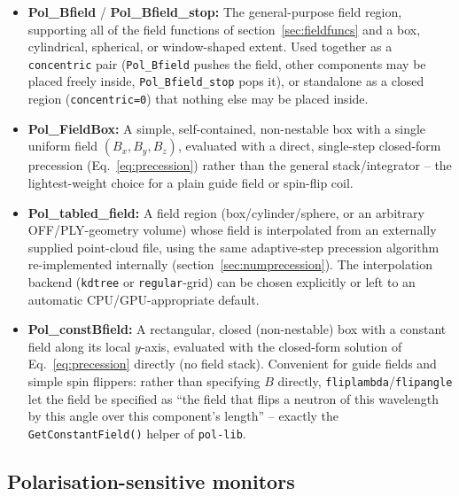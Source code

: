 \begin{itemize}
\item \textbf{Pol\_Bfield} / \textbf{Pol\_Bfield\_stop:} The general-purpose
  field region, supporting all of the field functions of
  section~\ref{sec:fieldfuncs} and a box, cylindrical, spherical, or
  window-shaped extent. Used together as a \texttt{concentric} pair
  (\texttt{Pol\_Bfield} pushes the field, other components may be placed
  freely inside, \texttt{Pol\_Bfield\_stop} pops it), or standalone as a
  closed region (\texttt{concentric=0}) that nothing else may be placed
  inside.
\item \textbf{Pol\_FieldBox:} A simple, self-contained, non-nestable box
  with a single uniform field $(B_x,B_y,B_z)$, evaluated with a direct,
  single-step closed-form precession (Eq.~\ref{eq:precession}) rather than
  the general stack/integrator -- the lightest-weight choice for a plain
  guide field or spin-flip coil.
\item \textbf{Pol\_tabled\_field:} A field region (box/cylinder/sphere, or
  an arbitrary OFF/PLY-geometry volume) whose field is interpolated from an
  externally supplied point-cloud file, using the same adaptive-step
  precession algorithm re-implemented internally
  (section~\ref{sec:numprecession}). The interpolation backend
  (\texttt{kdtree} or \texttt{regular}-grid) can be chosen explicitly or
  left to an automatic CPU/GPU-appropriate default.
\item \textbf{Pol\_constBfield:} A rectangular, closed (non-nestable) box
  with a constant field along its local $y$-axis, evaluated with the
  closed-form solution of Eq.~\ref{eq:precession} directly (no field
  stack). Convenient for guide fields and simple spin flippers: rather
  than specifying $B$ directly, \texttt{fliplambda}/\texttt{flipangle} let
  the field be specified as ``the field that flips a neutron of this
  wavelength by this angle over this component's length'' -- exactly the
  \texttt{GetConstantField()} helper of \texttt{pol-lib}.
\end{itemize}

\subsection{Polarisation-sensitive monitors}

